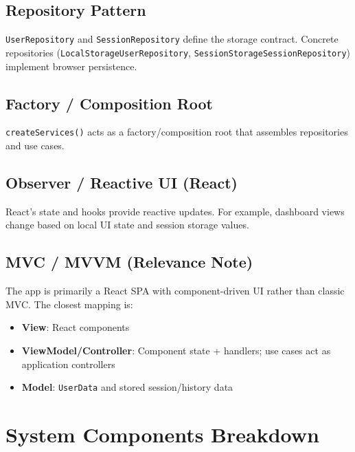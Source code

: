 \documentclass[11pt]{article}
\begin{document}
\subsection{Repository Pattern}
\texttt{UserRepository} and \texttt{SessionRepository} define the storage contract. Concrete repositories
(\texttt{LocalStorageUserRepository}, \texttt{SessionStorageSessionRepository}) implement browser persistence.

\subsection{Factory / Composition Root}
\texttt{createServices()} acts as a factory/composition root that assembles repositories and use cases.

\subsection{Observer / Reactive UI (React)}
React's state and hooks provide reactive updates. For example, dashboard views change based on local UI state and session storage values.

\subsection{MVC / MVVM (Relevance Note)}
The app is primarily a React SPA with component-driven UI rather than classic MVC. The closest mapping is:
\begin{itemize}[leftmargin=1.2em]
  \item \textbf{View}: React components
  \item \textbf{ViewModel/Controller}: Component state + handlers; use cases act as application controllers
  \item \textbf{Model}: \texttt{UserData} and stored session/history data
\end{itemize}

\section{System Components Breakdown}
\end{document}
